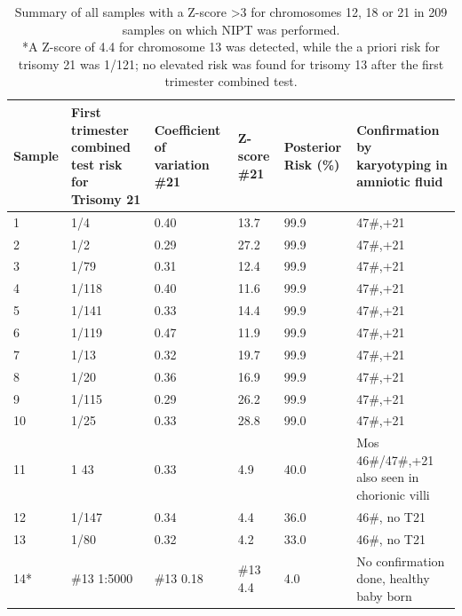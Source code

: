 \begin{table}
	\begin{tabular}{ p{1cm} p{3cm} p{2cm} p{2cm} p{2cm} p{2cm} }
		\footnotesize{Sample} & \footnotesize{First trimester combined test risk for Trisomy 21} & \footnotesize{Coefficient of variation \#21} & \footnotesize{Z-score \#21} & \footnotesize{Posterior Risk (\%)} & \footnotesize{Confirmation by karyotyping in amniotic fluid} \\
		\hline
		1 & 1/4          & 0.40      & 13.7     & 99.9 & 47\#,+21 \\
		2 & 1/2          & 0.29      & 27.2     & 99.9 & 47\#,+21 \\
		3 & 1/79         & 0.31      & 12.4     & 99.9 & 47\#,+21 \\
		4 & 1/118        & 0.40      & 11.6     & 99.9 & 47\#,+21 \\
		5 & 1/141        & 0.33      & 14.4     & 99.9 & 47\#,+21 \\
		6 & 1/119        & 0.47      & 11.9     & 99.9 & 47\#,+21 \\
		7 & 1/13         & 0.32      & 19.7     & 99.9 & 47\#,+21 \\
		8 & 1/20         & 0.36      & 16.9     & 99.9 & 47\#,+21 \\
		9 & 1/115        & 0.29      & 26.2     & 99.9 & 47\#,+21 \\
		10 & 1/25        & 0.33      & 28.8     & 99.0 & 47\#,+21 \\
		11 & 1 43        & 0.33      & 4.9      & 40.0 & Mos 46\#/47\#,+21 \footnotesize{also seen in chorionic villi}\\
		12 & 1/147       & 0.34      & 4.4      & 36.0 & 46\#, no T21 \\
		13 & 1/80        & 0.32      & 4.2      & 33.0 & 46\#, no T21 \\
		14* & \#13 1:5000 & \#13 0.18 & \#13 4.4 & 4.0  & \footnotesize{No confirmation done, healthy baby born}\\
		\hline
	\end{tabular}
	\caption[NIPTRIC Post-test probability summary table]{\label{table:summary} Summary of all samples with a Z-score \textgreater 3 for chromosomes 12, 18 or 21 in 209 samples on which NIPT was performed. \\
	*A Z-score of 4.4 for chromosome 13 was detected, while the a priori risk for trisomy 21 was 1/121; no elevated risk was found for trisomy 13 after the first trimester combined test.}
\end{table}

